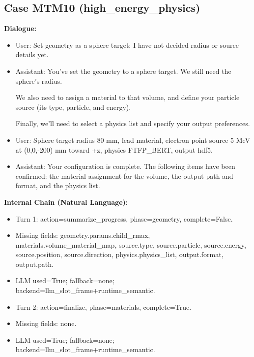 \documentclass[11pt]{ctexart}
\begin{document}
\subsection{Case MTM10 (high\_energy\_physics)}
\textbf{Dialogue:}
\begin{itemize}
\item User: Set geometry as a sphere target; I have not decided radius or source details yet.
\item Assistant: You've set the geometry to a sphere target. We still need the sphere's radius.

We also need to assign a material to that volume, and define your particle source (its type, particle, and energy).

Finally, we'll need to select a physics list and specify your output preferences.
\item User: Sphere target radius 80 mm, lead material, electron point source 5 MeV at (0,0,-200) mm toward +z, physics FTFP\_BERT, output hdf5.
\item Assistant: Your configuration is complete. The following items have been confirmed: the material assignment for the volume, the output path and format, and the physics list.
\end{itemize}
\textbf{Internal Chain (Natural Language):}
\begin{itemize}
\item Turn 1: action=summarize\_progress, phase=geometry, complete=False.
\item Missing fields: geometry.params.child\_rmax, materials.volume\_material\_map, source.type, source.particle, source.energy, source.position, source.direction, physics.physics\_list, output.format, output.path.
\item LLM used=True; fallback=none; backend=llm\_slot\_frame+runtime\_semantic.
\item Turn 2: action=finalize, phase=materials, complete=True.
\item Missing fields: none.
\item LLM used=True; fallback=none; backend=llm\_slot\_frame+runtime\_semantic.
\end{itemize}
\end{document}
